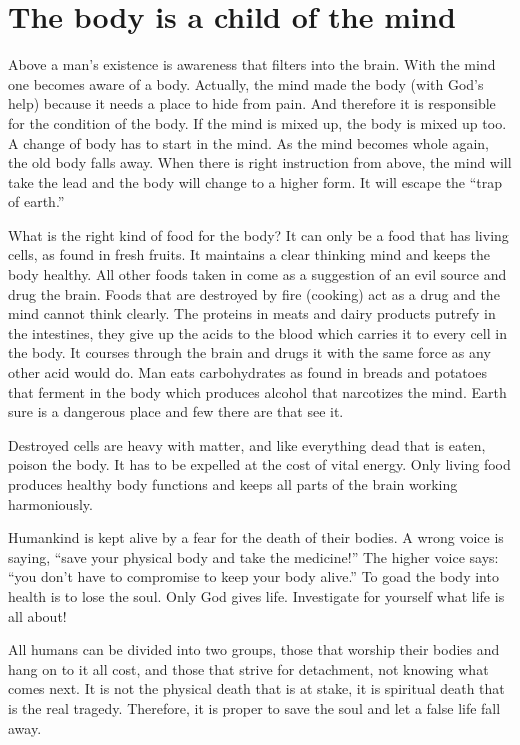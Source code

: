 \documentclass[12pt,letterpaper]{article}
\begin{document}
\section{The body is a child of the mind}
\label{sec:tbiacotm}

Above a man's existence is awareness that filters into the brain. With
the mind one becomes aware of a body. Actually, the mind made the body
(with God's help) because it needs a place to hide from pain. And
therefore it is responsible for the condition of the body. If the mind
is mixed up, the body is mixed up too. A change of body has to start
in the mind. As the mind becomes whole again, the old body falls
away. When there is right instruction from above, the mind will take
the lead and the body will change to a higher form. It will escape the
``trap of earth.''

What is the right kind of food for the body? It can only be a food
that has living cells, as found in fresh fruits. It maintains a clear
thinking mind and keeps the body healthy. All other foods taken in
come as a suggestion of an evil source and drug the brain. Foods that
are destroyed by fire (cooking) act as a drug and the mind cannot
think clearly. The proteins in meats and dairy products putrefy in the
intestines, they give up the acids to the blood which carries it to
every cell in the body. It courses through the brain and drugs it with
the same force as any other acid would do. Man eats carbohydrates as
found in breads and potatoes that ferment in the body which produces
alcohol that narcotizes the mind. Earth sure is a dangerous place and
few there are that see it.

Destroyed cells are heavy with matter, and like everything dead that
is eaten, poison the body. It has to be expelled at the cost of vital
energy. Only living food produces healthy body functions and keeps all
parts of the brain working harmoniously.

Humankind is kept alive by a fear for the death of their bodies. A
wrong voice is saying, ``save your physical body and take the
medicine!'' The higher voice says: ``you don't have to compromise to
keep your body alive.'' To goad the body into health is to lose the
soul. Only God gives life. Investigate for yourself what life is all
about!

All humans can be divided into two groups, those that worship their
bodies and hang on to it all cost, and those that strive for
detachment, not knowing what comes next. It is not the physical death
that is at stake, it is spiritual death that is the real
tragedy. Therefore, it is proper to save the soul and let a false life
fall away.
\end{document}
